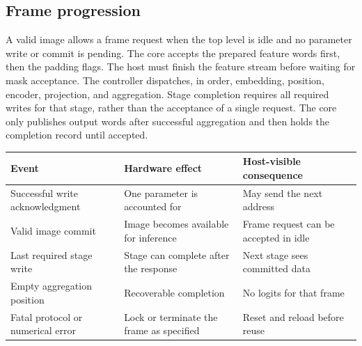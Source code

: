 
\subsection{Frame progression}
A valid image allows a frame request when the top level is idle and no parameter write or commit is pending. The core accepts the prepared feature words first, then the padding flags. The host must finish the feature stream before waiting for mask acceptance. The controller dispatches, in order, embedding, position, encoder, projection, and aggregation. Stage completion requires all required writes for that stage, rather than the acceptance of a single request. The core only publishes output words after successful aggregation and then holds the completion record until accepted.

{\smalltbl
\begin{tabularx}{\linewidth}{@{}P{40mm}YY@{}}
\toprule
Event & Hardware effect & Host-visible consequence\\ \midrule
Successful write acknowledgment & One parameter is accounted for & May send the next address\\
Valid image commit & Image becomes available for inference & Frame request can be accepted in idle\\
Last required stage write & Stage can complete after the response & Next stage sees committed data\\
Empty aggregation position & Recoverable completion & No logits for that frame\\
Fatal protocol or numerical error & Lock or terminate the frame as specified & Reset and reload before reuse\\
\bottomrule
\end{tabularx}}


